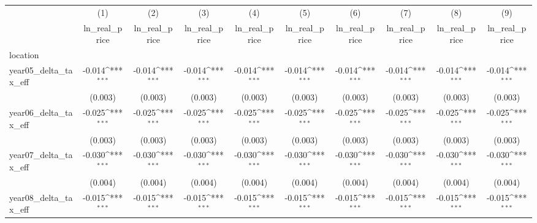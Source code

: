 {
\def\sym#1{\ifmmode^{#1}\else\(^{#1}\)\fi}
\begin{tabular}{l*{9}{c}}
\hline\hline
            &\multicolumn{1}{c}{(1)}&\multicolumn{1}{c}{(2)}&\multicolumn{1}{c}{(3)}&\multicolumn{1}{c}{(4)}&\multicolumn{1}{c}{(5)}&\multicolumn{1}{c}{(6)}&\multicolumn{1}{c}{(7)}&\multicolumn{1}{c}{(8)}&\multicolumn{1}{c}{(9)}\\
            &\multicolumn{1}{c}{ln_real_price}&\multicolumn{1}{c}{ln_real_price}&\multicolumn{1}{c}{ln_real_price}&\multicolumn{1}{c}{ln_real_price}&\multicolumn{1}{c}{ln_real_price}&\multicolumn{1}{c}{ln_real_price}&\multicolumn{1}{c}{ln_real_price}&\multicolumn{1}{c}{ln_real_price}&\multicolumn{1}{c}{ln_real_price}\\
\hline
location    &                     &                     &                     &                     &                     &                     &                     &                     &                     \\
year05_delta_tax_eff&      -0.014\sym{***}&      -0.014\sym{***}&      -0.014\sym{***}&      -0.014\sym{***}&      -0.014\sym{***}&      -0.014\sym{***}&      -0.014\sym{***}&      -0.014\sym{***}&      -0.014\sym{***}\\
            &     (0.003)         &     (0.003)         &     (0.003)         &     (0.003)         &     (0.003)         &     (0.003)         &     (0.003)         &     (0.003)         &     (0.003)         \\
[1em]
year06_delta_tax_eff&      -0.025\sym{***}&      -0.025\sym{***}&      -0.025\sym{***}&      -0.025\sym{***}&      -0.025\sym{***}&      -0.025\sym{***}&      -0.025\sym{***}&      -0.025\sym{***}&      -0.025\sym{***}\\
            &     (0.003)         &     (0.003)         &     (0.003)         &     (0.003)         &     (0.003)         &     (0.003)         &     (0.003)         &     (0.003)         &     (0.003)         \\
[1em]
year07_delta_tax_eff&      -0.030\sym{***}&      -0.030\sym{***}&      -0.030\sym{***}&      -0.030\sym{***}&      -0.030\sym{***}&      -0.030\sym{***}&      -0.030\sym{***}&      -0.030\sym{***}&      -0.030\sym{***}\\
            &     (0.004)         &     (0.004)         &     (0.004)         &     (0.004)         &     (0.004)         &     (0.004)         &     (0.004)         &     (0.004)         &     (0.004)         \\
[1em]
year08_delta_tax_eff&      -0.015\sym{***}&      -0.015\sym{***}&      -0.015\sym{***}&      -0.015\sym{***}&      -0.015\sym{***}&      -0.015\sym{***}&      -0.015\sym{***}&      -0.015\sym{***}&      -0.015\sym{***}\\

\end{tabular}}
